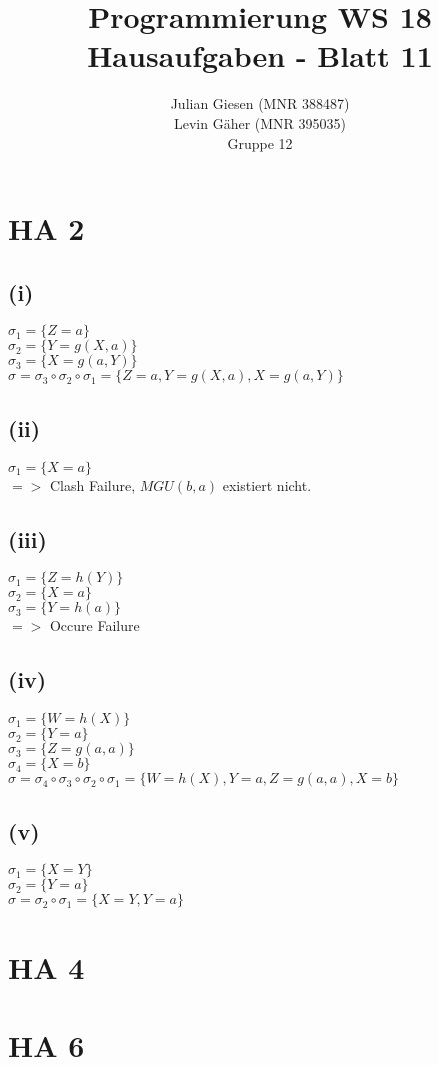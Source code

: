 \documentclass[a4paper]{article}
\title{ Programmierung WS 18 \\ Hausaufgaben - Blatt 11 }
\author{ Julian Giesen (MNR 388487) \\
Levin Gäher (MNR 395035) \\
Gruppe 12 }
\date{  }
\begin{document}
\maketitle

\section*{ HA 2 }
\subsection*{(i)}
$\sigma_1 = \{Z = a\}$\\
$\sigma_2 = \{Y = g(X,a)\}$\\
$\sigma_3 = \{X = g(a,Y)\}$\\
$\sigma = \sigma_3 \circ \sigma_2 \circ \sigma_1 = \{Z = a, Y = g(X,a), X = g(a,Y)\}$
\subsection*{(ii)}
$\sigma_1 = \{X = a\}$\\
$=>$ Clash Failure, $MGU(b,a)$ existiert nicht.
\subsection*{(iii)}
$\sigma_1 = \{Z = h(Y)\}$\\
$\sigma_2 = \{X = a\}$\\
$\sigma_3 = \{Y = h(a)\}$\\
$=>$ Occure Failure
\subsection*{(iv)}
$\sigma_1 = \{W = h(X)\}$\\
$\sigma_2 = \{Y = a\}$\\
$\sigma_3 = \{Z = g(a,a)\}$\\
$\sigma_4 = \{X = b\}$\\
$\sigma = \sigma_4 \circ \sigma_3 \circ \sigma_2 \circ \sigma_1= \{W = h(X), Y=a, Z = g(a,a), X =b\}$
\subsection*{(v)}
$\sigma_1 = \{X = Y\}$\\
$\sigma_2 = \{Y = a\}$\\
$\sigma = \sigma_2 \circ \sigma_1 = \{X = Y, Y = a\}$


\section*{ HA 4 }

\section*{ HA 6}
\end{document}
